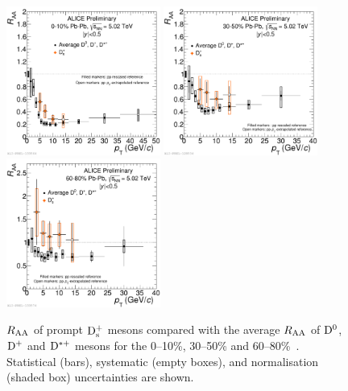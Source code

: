 \begin{figure}[!h]
\centering
\includegraphics[angle=0, width=0.45\textwidth]{FigCap5/DmesonAverageDs_010.pdf}
\includegraphics[angle=0, width=0.45\textwidth]{FigCap5/DmesonAverageDs_3050.pdf}
\includegraphics[angle=0, width=0.45\textwidth]{FigCap5/DmesonAverageDs_6080.pdf}
 \caption{$R_{\rm AA}$ 
  of prompt ${\rm D_s^+}$ mesons 
  compared with the average $R_{\rm AA}$ of ${\rm D^0}$, ${\rm D^+}$ and ${\rm D^{*+}}$ mesons for the 
0--10\%, 30--50\% and 60--80\%~\cite{ALICE-PUBLIC-2017-003}. 
Statistical (bars),  systematic (empty boxes), and normalisation (shaded box) 
uncertainties are shown.}
 \label{fig:DmesRaa} 
\end{figure} 


